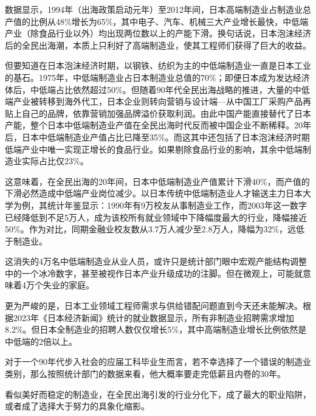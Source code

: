 数据显示，1994年（出海政策启动元年）至2012年间，日本高端制造业占制造业总产值的比例从48\%增长为65\%，其中电子、汽车、机械三大产业增长最快，中低端产业（除食品行业以外）均出现两位数以上的产能下滑。换句话说，日本泡沫经济后的全民出海潮，本质上只利好了高端制造业，使其工程师们获得了巨大的收益。

但要知道在日本泡沫经济时期，以钢铁、纺织为主的中低端制造业一直是日本工业的基石。1975年，中低端制造业占日本制造业总值的70\%；即便日本成为发达经济体后，中低端占比依然超过50\%。但随着90年代全民出海战略的推进，大量的中低端产业被转移到海外代工，日本企业则转向营销与设计端—从中国工厂采购产品再贴上自己的品牌，依靠营销加强品牌溢价获取利润。由此中国产能直接替代了日本产能，整个日本中低端制造业产值在全民出海时代反而被中国企业不断稀释。20年后，日本中低端制造业产值占比已降至35\%。而这其中还包括了日本泡沫经济时期低端产业中唯一实现正增长的食品行业。如果剔除食品行业的影响，其余中低端制造业实际占比仅23\%。

这意味着，在全民出海的20年间，日本中低端制造业产值累计下滑40\%，而产值的下滑必然造成中低端产业岗位减少。以日本传统中低端制造业人才输送主力日本大学为例，其统计年鉴显示：1990年有9万校友从事制造业工作，而2003年这一数字已经降低到不足5万人，成为该校所有就业领域中下降幅度最大的行业，降幅接近50\%。作为对比，同期金融业校友数从3.7万人减少至2.8万人，降幅为32\%，远低于制造业。

这消失的4万名中低端制造业从业人员，或许只是统计部门眼中宏观产能结构调整中的一个冰冷数字，甚至被视作日本产业升级成功的注脚。但在微观上，可能就意味着4万个失业的家庭。

更为严峻的是，日本工业领域工程师需求与供给错配问题直到今天还未能解决。根据2023年《日本经济新闻》统计的就业数据显示，所有非制造业招聘需求增加8.2\%。但日本全制造业的招聘人数仅仅增长5\%，其中高端制造业增长比例依然是中低端的2倍以上。

对于一个90年代步入社会的应届工科毕业生而言，若不幸选择了一个错误的制造业类别，那么按照统计部门的数据来看，他大概率要走完低薪且内卷的30年。

看似美好而稳定的制造业，在全民出海引发的行业分化下，成了最大的职业陷阱，或者成了选择大于努力的具象化缩影。
